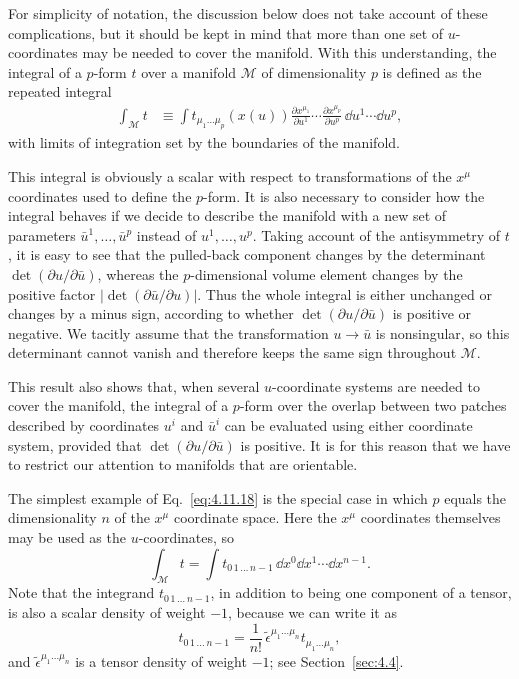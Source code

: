 For simplicity of notation, the discussion below does not take account of
these complications, but it should be kept in mind that more than one set of
\(u\)-coordinates may be needed to cover the manifold. With this
understanding, the integral of a \(p\)-form \(t\) over a manifold
\(\mathcal M\) of dimensionality \(p\) is defined as the repeated integral
\begin{align}
  \int_{\mathcal M}t
  &\equiv
  \int
  t_{\mu_1\ldots\mu_p}\!\left(x(u)\right)
  \frac{\partial x^{\mu_1}}{\partial u^1}
  \cdots
  \frac{\partial x^{\mu_p}}{\partial u^p}
  \,\dd u^1\cdots\dd u^p,
  \tag{4.11.18}\label{eq:4.11.18}
\end{align}
with limits of integration set by the boundaries of the manifold.

This integral is obviously a scalar with respect to transformations of the
\(x^\mu\) coordinates used to define the \(p\)-form. It is also necessary
to consider how the integral behaves if we decide to describe the manifold
with a new set of parameters \(\bar u^1,\ldots,\bar u^p\) instead of
\(u^1,\ldots,u^p\). Taking account of the antisymmetry of \(t\), it is easy
to see that the pulled-back component changes by the determinant
\(\det(\partial u/\partial\bar u)\), whereas the \(p\)-dimensional volume
element changes by the positive factor
\(\lvert\det(\partial\bar u/\partial u)\rvert\). Thus the whole integral is
either unchanged or changes by a minus sign, according to whether
\(\det(\partial u/\partial\bar u)\) is positive or negative. We tacitly
assume that the transformation \(u\to\bar u\) is nonsingular, so this
determinant cannot vanish and therefore keeps the same sign throughout
\(\mathcal M\).

This result also shows that, when several \(u\)-coordinate systems are
needed to cover the manifold, the integral of a \(p\)-form over the overlap
between two patches described by coordinates \(u^i\) and \(\bar u^i\) can
be evaluated using either coordinate system, provided that
\(\det(\partial u/\partial\bar u)\) is positive. It is for this reason that
we have to restrict our attention to manifolds that are orientable.

The simplest example of Eq.~\eqref{eq:4.11.18} is the special case in which
\(p\) equals the dimensionality \(n\) of the \(x^\mu\) coordinate space.
Here the \(x^\mu\) coordinates themselves may be used as the
\(u\)-coordinates, so
\[
  \int_{\mathcal M}t
  =
  \int
  t_{0\,1\,\ldots\,n-1}\,
  \dd x^0\dd x^1\cdots\dd x^{n-1}.
\]
Note that the integrand \(t_{0\,1\,\ldots\,n-1}\), in addition to being one
component of a tensor, is also a scalar density of weight \(-1\), because
we can write it as
\[
  t_{0\,1\,\ldots\,n-1}
  =
  \frac{1}{n!}\,
  \tilde\epsilon^{\mu_1\ldots\mu_n}
  t_{\mu_1\ldots\mu_n},
\]
and \(\tilde\epsilon^{\mu_1\ldots\mu_n}\) is a tensor density of weight
\(-1\);
see Section~\ref{sec:4.4}.

